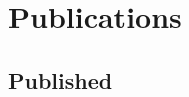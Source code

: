 \documentclass[11pt,letterpaper,sans,unicode]{moderncv}
\newcommand{\blucirc}{{\color{color1} $\circ\;\;$}}
\begin{document}
\makecvtitle

\vspace{-13mm}


%

%

\section{Publications}




\subsection{Published}

\begin{etaremune}[leftmargin=8mm]

\end{etaremune}
\end{document}
